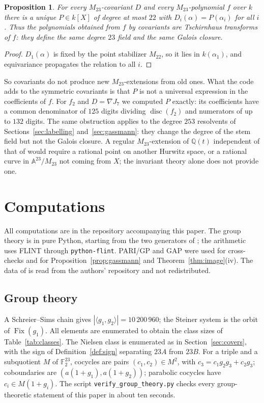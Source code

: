 \documentclass[11pt]{amsart}
\newtheorem{proposition}[theorem]{Proposition}
\theoremstyle{definition}
\newcommand{\QQ}{\mathbb{Q}}
\newcommand{\FF}{\mathbb{F}}
\newcommand{\Fix}{\operatorname{Fix}}
\newcommand{\M}{M_{23}}
\begin{document}
\begin{proposition}\label{prop:tschirnhaus}
For every $\M$-covariant $D$ and every $\M$-polynomial $f$ over $k$ there is a unique $P\in k[X]$ of degree at most $22$ with $D_i(\alpha)=P(\alpha_i)$ for all $i$. Thus the polynomials obtained from $f$ by covariants are Tschirnhaus transforms of $f$: they define the same degree $23$ field and the same Galois closure.
\end{proposition}
\begin{proof}
$D_1(\alpha)$ is fixed by the point stabilizer $M_{22}$, so it lies in $k(\alpha_1)$, and equivariance propagates the relation to all $i$.
\end{proof}

So covariants do not produce new $\M$-extensions from old ones. What the code adds to the symmetric covariants is that $P$ is not a universal expression in the coefficients of $f$. For $f_2$ and $D=\nabla J_7$ we computed $P$ exactly: its coefficients have a common denominator of $125$ digits dividing $\operatorname{disc}(f_2)$ and numerators of up to $132$ digits. The same obstruction applies to the degree $253$ resolvents of Sections~\ref{sec:labelling} and~\ref{sec:gassmann}: they change the degree of the stem field but not the Galois closure. A regular $\M$-extension of $\QQ(t)$ independent of that of \cite{HJLPPZ26} would require a rational point on another Hurwitz space, or a rational curve in $\mathbb A^{23}/\M$ not coming from $X$; the invariant theory alone does not provide one.

\section{Computations}\label{sec:computations}

All computations are in the repository accompanying this paper. The group theory is in pure Python, starting from the two generators of \cite{HJLPPZ26}; the arithmetic uses FLINT \cite{FLINT} through \texttt{python-flint}. PARI/GP \cite{PARI} and GAP \cite{GAP} were used for cross-checks and for Proposition~\ref{prop:gassmann} and Theorem~\ref{thm:image}(iv). The data of \cite{HJLPPZ26} is read from the authors' repository and not redistributed.

\subsection*{Group theory}
A Schreier--Sims chain gives $|\langle g_1,g_2\rangle|=10\,200\,960$; the Steiner system is the orbit of $\Fix(g_1)$. All elements are enumerated to obtain the class sizes of Table~\ref{tab:classes}. The Nielsen class is enumerated as in Section~\ref{sec:covers}, with the sign of Definition~\ref{def:sign} separating $23A$ from $23B$. For a triple and a subquotient $M$ of $\FF_2^{23}$, cocycles are pairs $(c_1,c_2)\in M^2$, with $c_3=c_1g_2g_3+c_2g_3$; coboundaries are $(a(1+g_1),a(1+g_2))$; parabolic cocycles have $c_i\in M(1+g_i)$. The script \texttt{verify\_group\_theory.py} checks every group-theoretic statement of this paper in about ten seconds.
\end{document}
